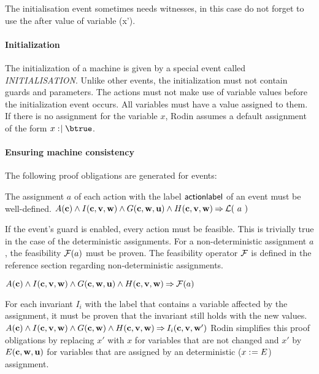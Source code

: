 The initialisation event sometimes needs witnesses, in this case do not forget to use the after value of variable (x'). 

\paragraph{Initialization}
The initialization of a machine is given by a special event called \textsl{INITIALISATION}.
Unlike other events, the initialization must not contain guards and parameters.
The actions must not make use of variable values before the initialization event occurs.
All variables must have a value assigned to them. If there is no assignment for the variable $x$, Rodin assumes a default assignment of the form $x\bcmsuch \btrue$.

\paragraph{Ensuring machine consistency}
\label{consistency_proof_obligations}
The following proof obligations are generated for events:

The assignment $a$ of each action with the label $\textsf{actionlabel}$ of an event must be well-defined.
  {}%
  {$A(\mathbf{c}) \land I(\mathbf{c},{\mathbf{v},\mathbf{w}}) \land G(\mathbf{c},\mathbf{w},\mathbf{u}) 
    \land H(\mathbf{c},{\mathbf{v},\mathbf{w}}) \mathbin\Rightarrow \mathcal{L}(~a~)$}
  
If the event's guard is enabled, every action must be feasible.
  This is trivially true in the case of the deterministic assignments.
  For a non-deterministic assignment $a$, the feasibility $\mathcal{F}(a)$ must be proven.
  The feasibility operator $\mathcal{F}$ is defined in the reference
  section regarding non-deterministic assignments.
  
  {$A(\mathbf{c}) \land I(\mathbf{c},{\mathbf{v},\mathbf{w}}) \land G(\mathbf{c},\mathbf{w},\mathbf{u})
    \land H(\mathbf{c},{\mathbf{v},\mathbf{w}}) \mathbin\Rightarrow \mathcal{F}(a)$}

For each invariant $I_i$ with the label  
  that contains a variable affected by the assignment, it must be proven
  that the invariant still holds with the new values.
  {}%
  {$A(\mathbf{c}) \land I(\mathbf{c},{\mathbf{v},\mathbf{w}}) \land G(\mathbf{c},\mathbf{w}) 
    \land H(\mathbf{c},{\mathbf{v},\mathbf{w}}) \mathbin\Rightarrow I_i(\mathbf{c},{\mathbf{v},\mathbf{w}}')$}
  Rodin simplifies this proof obligations by replacing $x'$ with $x$ for variables that are not
  changed and $x'$ by $E(\mathbf{c},\mathbf{w},\mathbf{u})$ 
  for variables that are assigned by an deterministic ($x \mathrel{:\mkern1mu=} E$) assignment.

